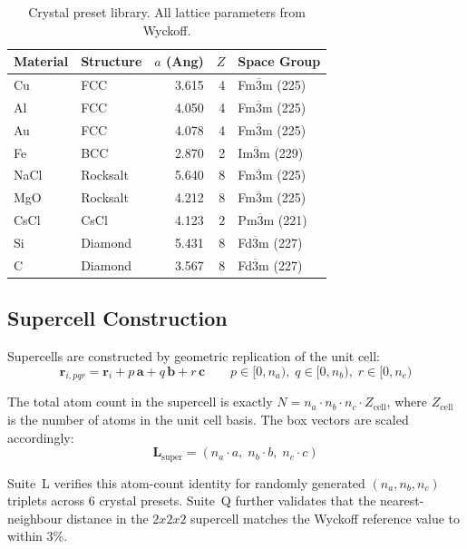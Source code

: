 \documentclass[11pt,twoside]{article}
\def\AA{Ang}%
\def\times{x}%
\begin{document}
\begin{table}[H]
\centering
\caption{Crystal preset library. All lattice parameters from Wyckoff.}
\label{tab:presets}
\begin{tabular}{llrrl}
\toprule
\textbf{Material} & \textbf{Structure} & \textbf{$a$ (\AA)} & \textbf{$Z$} & \textbf{Space Group} \\
\midrule
Cu  & FCC      & 3.615 & 4 & Fm$\overline{3}$m (225) \\
Al  & FCC      & 4.050 & 4 & Fm$\overline{3}$m (225) \\
Au  & FCC      & 4.078 & 4 & Fm$\overline{3}$m (225) \\
Fe  & BCC      & 2.870 & 2 & Im$\overline{3}$m (229) \\
NaCl & Rocksalt & 5.640 & 8 & Fm$\overline{3}$m (225) \\
MgO  & Rocksalt & 4.212 & 8 & Fm$\overline{3}$m (225) \\
CsCl & CsCl    & 4.123 & 2 & Pm$\overline{3}$m (221) \\
Si   & Diamond  & 5.431 & 8 & Fd$\overline{3}$m (227) \\
C    & Diamond  & 3.567 & 8 & Fd$\overline{3}$m (227) \\
\bottomrule
\end{tabular}
\end{table}

\subsection{Supercell Construction}

Supercells are constructed by geometric replication of the unit cell:
\begin{equation}
  \mathbf{r}_{i,pqr} = \mathbf{r}_i + p\,\mathbf{a} + q\,\mathbf{b} + r\,\mathbf{c}
  \qquad p \in [0, n_a),\; q \in [0, n_b),\; r \in [0, n_c)
  \label{eq:supercell}
\end{equation}

The total atom count in the supercell is exactly $N = n_a \cdot n_b \cdot n_c \cdot Z_{\mathrm{cell}}$, where $Z_{\mathrm{cell}}$ is the number of atoms in the unit cell basis. The box vectors are scaled accordingly:
\begin{equation}
  \mathbf{L}_{\mathrm{super}} = (n_a \cdot a,\; n_b \cdot b,\; n_c \cdot c)
  \label{eq:super-box}
\end{equation}

Suite~L verifies this atom-count identity for randomly generated $(n_a, n_b, n_c)$ triplets across 6 crystal presets. Suite~Q further validates that the nearest-neighbour distance in the $2 \times 2 \times 2$ supercell matches the Wyckoff reference value to within 3\%.
\end{document}
